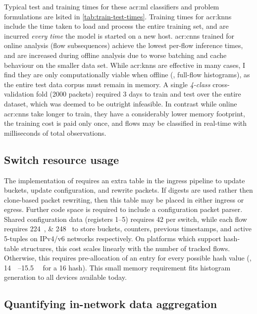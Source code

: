 Typical test and training times for these \gls{acr:ml} classifiers and problem formulations are lsited in \cref{tab:train-test-times}.
Training times for \glspl{acr:knn} include the time taken to load and process the entire training set, and are incurred \emph{every time} the model is started on a new host.
\glspl{acr:cnn} trained for online analysis (flow subsequences) achieve the lowest per-flow inference times, and are increased during offline analysis due to worse batching and cache behaviour on the smaller data set.
While \glspl{acr:knn} are effective in many cases, I find they are only computationally viable when offline (\ie, full-flow histograms), as the entire test data corpus must remain in memory.
A single \emph{4-class} cross-validation fold (\num{2000} packets) required 3 days to train and test over the entire dataset, which was deemed to be outright infeasible.
In contrast while online \glspl{acr:cnn} take longer to train, they have a considerably lower memory footprint, the training cost is paid only once, and flows may be classified in real-time with milliseconds of total observations.

\subsection{Switch resource usage}
The implementation of \seidr{} requires an extra table in the ingress pipeline to update buckets, update configuration, and rewrite packets.
If digests are used rather then clone-based packet rewriting, then this table may be placed in either ingress or egress.
Further code space is required to include a configuration packet parser.
Shared configuration data (registers \numrange{1}{5}) requires \qty{42}{\byte} per switch, while each flow requires \qtylist{224;248}{\byte} to store buckets, counters, previous timestamps, and active 5-tuples on IPv4/v6 networks respectively.
On platforms which support hash-table structures, this cost scales linearly with the number of tracked flows.
Otherwise, this requires pre-allocation of an entry for every possible hash value (\eg, \qtyrange{14}{15.5}{\mebi\byte} for a \qty{16}{\bit} hash). This small memory requirement fits histogram generation to all devices available today.

\subsection{Quantifying in-network data aggregation}

